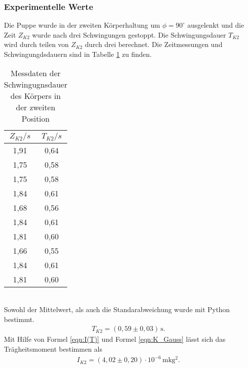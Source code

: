 \subsubsection{Experimentelle Werte}
Die Puppe wurde in der zweiten Körperhaltung um $\phi = 90^{\circ}$ ausgelenkt und die Zeit $Z_{K2}$
wurde nach drei Schwingungen gestoppt. Die Schwingungsdauer $T_{K2}$ wird durch teilen von $Z_{K2}$
durch drei berechnet. Die Zeitmessungen und Schwingungdsdauern sind in Tabelle \ref{tab:Koerper2} zu finden.
\begin{table}
  \centering
  \caption{Messdaten der Schwingugnsdauer des Körpers in der zweiten Position}
  \label{tab:Koerper2}
  \begin{tabular}{c c}
    \toprule
    $Z_{K2}/s$ & $T_{K2}/s$ \\
    \midrule
    1,91 & 0,64 \\
    1,75 & 0,58 \\
    1,75 & 0,58 \\
    1,84 & 0,61 \\
    1,68 & 0,56 \\
    1,84 & 0,61 \\
    1,81 & 0,60 \\
    1,66 & 0,55 \\
    1,84 & 0,61 \\
    1,81 & 0,60 \\
    \bottomrule
  \end{tabular}
\end{table}
\\
Sowohl der Mittelwert, als auch die Standarabweichung wurde mit Python bestimmt.
\begin{align*}
  T_{K2} = (0{,}59 \pm 0{,}03)\, \mathrm{s} .
\end{align*}
Mit Hilfe von Formel \ref{eqn:I(T)} und Formel \ref{eqn:K_Gauss} lässt sich das Trägheitsmoment bestimmen als
\begin{align*}
  I_{K2} = (4{,}02 \pm 0{,}20) \cdot 10^{-6}\, \mathrm{mkg^2}.
\end{align*}